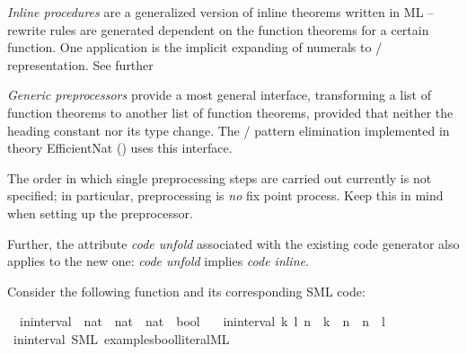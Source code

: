 \begin{isabellebody}
\begin{isamarkuptext}
  \emph{Inline procedures} are a generalized version of inline
  theorems written in ML -- rewrite rules are generated dependent
  on the function theorems for a certain function.  One
  application is the implicit expanding of  numerals
  to  /  representation.  See further

  \emph{Generic preprocessors} provide a most general interface,
  transforming a list of function theorems to another
  list of function theorems, provided that neither the heading
  constant nor its type change.  The  / 
  pattern elimination implemented in
  theory EfficientNat () uses this
  interface.

  \begin{warn}
    The order in which single preprocessing steps are carried
    out currently is not specified; in particular, preprocessing
    is \emph{no} fix point process.  Keep this in mind when
    setting up the preprocessor.

    Further, the attribute \emph{code unfold}
    associated with the existing code generator also applies to
    the new one: \emph{code unfold} implies \emph{code inline}.
  \end{warn}%
\end{isamarkuptext}%
\isamarkuptrue%
%
\isamarkuptrue%
%
\begin{isamarkuptext}%
Consider the following function and its corresponding
  SML code:%
\end{isamarkuptext}%
\isamarkuptrue%
\isamarkupfalse%
\isanewline
\ \ in{\isacharunderscore}interval\ {\isacharcolon}{\isacharcolon}\ {\isachardoublequoteopen}nat\ {\isasymtimes}\ nat\ {\isasymRightarrow}\ nat\ {\isasymRightarrow}\ bool{\isachardoublequoteclose}\ \isanewline
\ \ {\isachardoublequoteopen}in{\isacharunderscore}interval\ {\isacharparenleft}k{\isacharcomma}\ l{\isacharparenright}\ n\ {\isasymlongleftrightarrow}\ k\ {\isasymle}\ n\ {\isasymand}\ n\ {\isasymle}\ l{\isachardoublequoteclose}%
\isadelimtt
%
\endisadelimtt
%
\isatagtt
%
\endisatagtt
{\isafoldtt}%
%
\isadelimtt
\isanewline
%
\endisadelimtt
{}\isamarkupfalse%
\ in{\isacharunderscore}interval\ {\isacharparenleft}SML\ {\isachardoublequoteopen}examples{\isacharslash}bool{\isacharunderscore}literal{\isachardot}ML{\isachardoublequoteclose}{\isacharparenright}%
\begin{isamarkuptext}%


\end{isamarkuptext}
\end{isabellebody}
